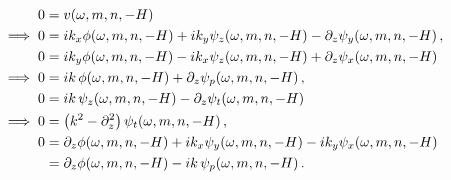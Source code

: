 \documentclass[reqno]{amsart}
\numberwithin{equation}{section}
\numberwithin{figure}{section}
\begin{document}
\begin{align*}
0 &= v\!\left(\omega,m,n,-\aHeight\right) \\
\implies
0 &= ik_{x}\vPotential\!\left(\omega,m,n,-\aHeight\right)+ik_{y}\vStream_{z}\!\left(\omega,m,n,-\aHeight\right)-\partial_{z}\vStream_{y}\!\left(\omega,m,n,-\aHeight\right), \\
0 &= ik_{y}\vPotential\!\left(\omega,m,n,-\aHeight\right)-ik_{x}\vStream_{z}\!\left(\omega,m,n,-\aHeight\right)+\partial_{z}\vStream_{x}\!\left(\omega,m,n,-\aHeight\right) \\
\implies
0 &= ik\,\vPotential\!\left(\omega,m,n,-\aHeight\right)+\partial_{z}\vStream_{p}\!\left(\omega,m,n,-\aHeight\right), \\
0 &= ik\,\vStream_{z}\!\left(\omega,m,n,-\aHeight\right)-\partial_{z}\vStream_{t}\!\left(\omega,m,n,-\aHeight\right) \\
\implies
0 &= \left(k^{2}-\partial_{z}^{2}\right)\vStream_{t}\!\left(\omega,m,n,-\aHeight\right), \\
0 &= \partial_{z}\vPotential\!\left(\omega,m,n,-\aHeight\right)+ik_{x}\vStream_{y}\!\left(\omega,m,n,-\aHeight\right)-ik_{y}\vStream_{x}\!\left(\omega,m,n,-\aHeight\right) \\
  &= \partial_{z}\vPotential\!\left(\omega,m,n,-\aHeight\right)-ik\,\vStream_{p}\!\left(\omega,m,n,-\aHeight\right).
\end{align*}
\end{document}
